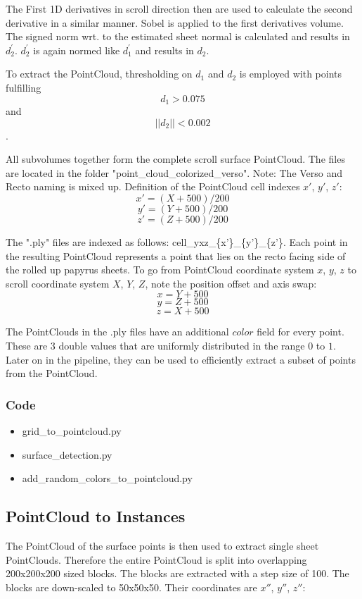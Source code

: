 \documentclass[peerreview]{IEEEtran}
\begin{document}
The First 1D derivatives in scroll direction then are used to calculate the second derivative in a similar manner. Sobel is applied to the first derivatives volume. The signed norm wrt. to the estimated sheet normal is calculated and results in $d_2^{'}$. $d_2^{'}$ is again normed like $d_1^{'}$ and results in $d_2$.

To extract the PointCloud, thresholding on $d_1$ and $d_2$ is employed with points fulfilling
\[
d_1 > 0.075
\]
and
\[
||d_2|| < 0.002
\].

All subvolumes together form the complete scroll surface PointCloud. The files are located in the folder "point\_cloud\_colorized\_verso". Note: The Verso and Recto naming is mixed up.
Definition of the PointCloud cell indexes $x'$, $y'$, $z'$:
\[
x' = (X + 500)/200
\]
\[
y' = (Y + 500)/200
\]
\[
z' = (Z + 500)/200
\]

The ".ply" files are indexed as follows: cell\_yxz\_\{x'\}\_\{y'\}\_\{z'\}. Each point in the resulting PointCloud represents a point that lies on the recto facing side of the rolled up papyrus sheets. To go from PointCloud coordinate system $x$, $y$, $z$ to scroll coordinate system $X$, $Y$, $Z$, note the position offset and axis swap:
\[
x = Y + 500
\]
\[
y = Z + 500
\]
\[
z = X + 500
\]

The PointClouds in the .ply files have an additional $color$ field for every point. These are 3 double values that are uniformly distributed in the range $0$ to $1$. Later on in the pipeline, they can be used to efficiently extract a subset of points from the PointCloud.

\subsubsection{Code}
\begin{itemize}
    \item grid\_to\_pointcloud.py
    \item surface\_detection.py
    \item add\_random\_colors\_to\_pointcloud.py
\end{itemize}

\subsection{PointCloud to Instances}
The PointCloud of the surface points is then used to extract single sheet PointClouds. Therefore the entire PointCloud is split into overlapping 200x200x200 sized blocks. The blocks are extracted with a step size of 100. The blocks are down-scaled to 50x50x50. Their coordinates are $x''$, $y''$, $z''$:
\end{document}
